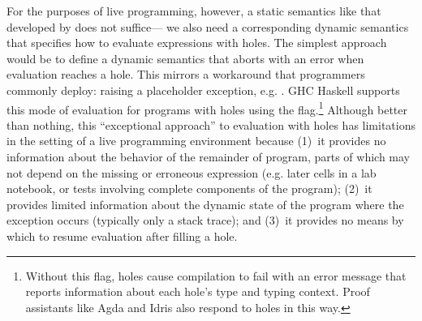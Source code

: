 %
For the purposes of live programming, however, a static semantics like that developed by \citet{popl-paper} does not suffice---%
we also need a corresponding dynamic semantics that specifies how to evaluate expressions with holes.
%
%
The simplest approach would be to define a dynamic semantics that aborts with an error when evaluation reaches a hole. 
%
This mirrors a workaround that programmers commonly deploy: 
raising a placeholder exception, e.g. . 
GHC Haskell supports this mode of evaluation for programs with holes using the  flag.\footnote{
Without this flag, holes cause compilation to fail with an error message that reports information about each hole's type and typing context. 
Proof assistants like Agda \cite{norell:thesis,norell2009dependently} and Idris \cite{brady2013idris} also respond to holes in this way.
} 
Although better than nothing, this ``exceptional approach'' to evaluation with holes has limitations 
in the setting of a live programming environment because 
(1)~it provides no information about the behavior of the remainder of program, 
parts of which may not depend on the missing or erroneous expression (e.g. later cells in a lab notebook, or tests involving complete components of the program); 
(2)~it provides limited information about the dynamic state of the program where the exception occurs
(typically only a stack trace);  
and 
(3)~it provides no means by which to resume evaluation after filling a hole.


